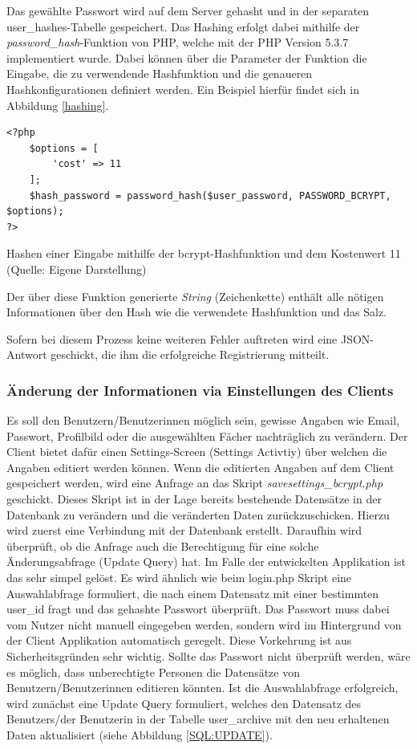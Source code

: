 \documentclass[../main.tex]{subfiles}
\begin{document}
	 Das gewählte Passwort wird auf dem Server gehasht und in der separaten user\_hashes-Tabelle gespeichert. Das Hashing erfolgt dabei mithilfe der \emph{password\_hash}-Funktion von PHP, welche mit der PHP Version 5.3.7 implementiert wurde. Dabei können über die Parameter der Funktion die Eingabe, die zu verwendende Hashfunktion und die genaueren Hashkonfigurationen definiert werden. Ein Beispiel hierfür findet sich in Abbildung \ref{hashing}.
	 \begin{code}
	 	\begin{center}
	 		\begin{verbatim}
<?php
	$options = [
		'cost' => 11
	];
	$hash_password = password_hash($user_password, PASSWORD_BCRYPT, $options);
?>	
	 		\end{verbatim}
	 		\caption{Hashen einer Eingabe mithilfe der bcrypt-Hashfunktion und dem Kostenwert 11 (Quelle: Eigene Darstellung)}\label{hashing}
	 	\end{center}
	 \end{code}	
	 Der über diese Funktion generierte \emph{String} (Zeichenkette) enthält alle nötigen Informationen über den Hash wie die verwendete Hashfunktion und das Salz.
	 
	 Sofern bei diesem Prozess keine weiteren Fehler auftreten wird eine JSON-Antwort geschickt, die ihm die erfolgreiche Registrierung mitteilt.
	 
	 \subsubsection{Änderung der Informationen via Einstellungen des Clients}
	 Es soll den Benutzern/Benutzerinnen möglich sein, gewisse Angaben wie Email, Passwort, Profilbild oder die ausgewählten Fächer nachträglich zu verändern. Der Client bietet dafür einen Settings-Screen (Settings Activtiy) über welchen die Angaben editiert werden können. Wenn die editierten Angaben auf dem Client gespeichert werden, wird eine Anfrage an das Skript \emph{savesettings\_bcrypt.php} geschickt. Dieses Skript ist in der Lage bereits bestehende Datensätze in der Datenbank zu verändern und die veränderten Daten zurückzuschicken. Hierzu wird zuerst eine Verbindung mit der Datenbank erstellt. Daraufhin wird überprüft, ob die Anfrage auch die Berechtigung für eine solche Änderungsabfrage (Update Query) hat. Im Falle der entwickelten Applikation ist das sehr simpel gelöst. Es wird ähnlich wie beim login.php Skript eine Auswahlabfrage formuliert, die nach einem Datensatz mit einer bestimmten user\_id fragt und das gehashte Passwort überprüft. Das Passwort muss dabei vom Nutzer nicht manuell eingegeben werden, sondern wird im Hintergrund von der Client Applikation automatisch geregelt. Diese Vorkehrung ist aus Sicherheitsgründen sehr wichtig. Sollte das Passwort nicht überprüft werden, wäre es möglich, dass unberechtigte Personen die Datensätze von Benutzern/Benutzerinnen editieren könnten. Ist die Auswahlabfrage erfolgreich, wird zunächst eine Update Query formuliert, welches den Datensatz des Benutzers/der Benutzerin in der Tabelle user\_archive mit den neu erhaltenen Daten aktualisiert (siehe Abbildung \ref{SQL:UPDATE}).
	 
\end{document}
